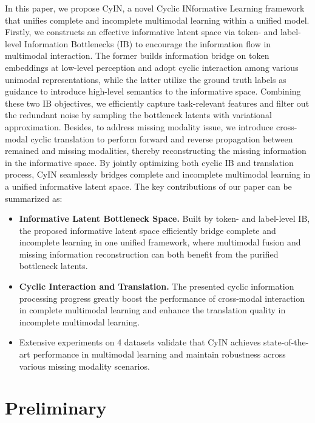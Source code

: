 \documentclass{article}
\begin{document}
In this paper, we propose CyIN, a novel Cyclic INformative Learning framework that unifies complete and incomplete multimodal learning within a unified model. Firstly, we constructs an effective informative latent space via token- and label-level Information Bottlenecks (IB) to encourage the information flow in multimodal interaction. The former builds information bridge on token embeddings at low-level perception and adopt cyclic interaction among various unimodal representations, while the latter utilize the ground truth labels as guidance to introduce high-level semantics to the informative space. Combining these two IB objectives, we efficiently capture task-relevant features and filter out the redundant noise by sampling the bottleneck latents with variational approximation. Besides, to address missing modality issue, we introduce cross-modal cyclic translation to perform forward and reverse propagation between remained and missing modalities, thereby reconstructing the missing information in the informative space. By jointly optimizing both cyclic IB and translation 
process, CyIN seamlessly bridges complete and incomplete multimodal learning in a unified informative latent space. The key contributions of our paper can be summarized as:

\begin{itemize}
\item \textbf{Informative Latent Bottleneck Space.} Built by token- and label-level IB, the proposed informative latent space efficiently bridge complete and incomplete learning in one unified framework, where multimodal fusion and missing information reconstruction can both benefit from the purified bottleneck latents.

\item \textbf{Cyclic Interaction and Translation.} The presented cyclic information processing progress greatly boost the performance of cross-modal interaction in complete multimodal learning and enhance the translation quality in incomplete multimodal learning.

\item Extensive experiments on 4 datasets validate that CyIN achieves state-of-the-art performance in multimodal learning and maintain robustness across various missing modality scenarios.
\end{itemize}

\section{Preliminary}
\end{document}
